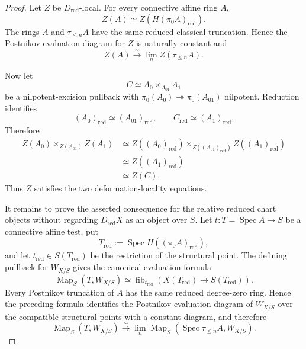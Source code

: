 \begin{proof}
Let $Z$ be $D_{\mathrm{red}}$-local.  For every connective affine ring $A$,
\[
    Z(A)\simeq Z(H(\pi_0A)_{\mathrm{red}}).
\]
The rings $A$ and $\tau_{\leq n}A$ have the same reduced classical
truncation.  Hence the Postnikov evaluation diagram for $Z$ is naturally
constant and
\[
    Z(A)\xrightarrow{\sim}\lim_nZ(\tau_{\leq n}A).
\]

Now let
\[
    C\simeq A_0\times_{A_{01}}A_1
\]
be a nilpotent-excision pullback with
$\pi_0(A_0)\twoheadrightarrow\pi_0(A_{01})$ nilpotent.  Reduction identifies
\[
    (A_0)_{\mathrm{red}}\simeq(A_{01})_{\mathrm{red}},
    \qquad
    C_{\mathrm{red}}\simeq(A_1)_{\mathrm{red}}.
\]
Therefore
\[
\begin{aligned}
    Z(A_0)\times_{Z(A_{01})}Z(A_1)
    &\simeq
    Z((A_0)_{\mathrm{red}})
    \times_{Z((A_{01})_{\mathrm{red}})}
    Z((A_1)_{\mathrm{red}})\\
    &\simeq Z((A_1)_{\mathrm{red}})\\
    &\simeq Z(C).
\end{aligned}
\]
Thus $Z$ satisfies the two deformation-locality equations.

It remains to prove the asserted consequence for the relative reduced chart
objects without regarding $D_{\mathrm{red}}X$ as an object over $S$.  Let
$t:T=\operatorname{Spec}A\to S$ be a connective affine test, put
\[
    T_{\mathrm{red}}
    :=
    \operatorname{Spec}H((\pi_0A)_{\mathrm{red}}),
\]
and let $t_{\mathrm{red}}\in S(T_{\mathrm{red}})$ be the restriction of the
structural point.  The defining pullback for $W_{X/S}$ gives the canonical
evaluation formula
\[
\boxed{
    \operatorname{Map}_S(T,W_{X/S})
    \simeq
    \operatorname{fib}_{t_{\mathrm{red}}}
    \left(
      X(T_{\mathrm{red}})
      \longrightarrow
      S(T_{\mathrm{red}})
    \right).}
\]
Every Postnikov truncation of $A$ has the same reduced degree-zero ring.
Hence the preceding formula identifies the Postnikov evaluation diagram of
$W_{X/S}$ over the compatible structural points with a constant diagram, and
therefore
\[
    \operatorname{Map}_S(T,W_{X/S})
    \xrightarrow{\sim}
    \lim_n
    \operatorname{Map}_S
    (\operatorname{Spec}\tau_{\leq n}A,W_{X/S}).
\]


\end{proof}
